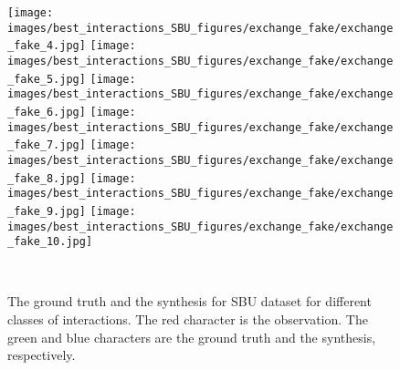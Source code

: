 \documentclass[times,twocolumn,final]{elsarticle}
\begin{document}
\begin{figure*}
\begin{minipage}{0.9\textwidth}
  \hfill
  \texttt{[image: images/best\_interactions\_SBU\_figures/exchange\_fake/exchange\_fake\_4.jpg]}
  \hfill
  \texttt{[image: images/best\_interactions\_SBU\_figures/exchange\_fake/exchange\_fake\_5.jpg]}
  \hfill
  \texttt{[image: images/best\_interactions\_SBU\_figures/exchange\_fake/exchange\_fake\_6.jpg]}
  \hfill
  \texttt{[image: images/best\_interactions\_SBU\_figures/exchange\_fake/exchange\_fake\_7.jpg]}
  \hfill
  \texttt{[image: images/best\_interactions\_SBU\_figures/exchange\_fake/exchange\_fake\_8.jpg]}
  \hfill
  \texttt{[image: images/best\_interactions\_SBU\_figures/exchange\_fake/exchange\_fake\_9.jpg]}
  \hfill
  \texttt{[image: images/best\_interactions\_SBU\_figures/exchange\_fake/exchange\_fake\_10.jpg]}
  \hfill
    \end{minipage}\\
    \caption{\label{fig:3}The ground truth and the synthesis for SBU dataset for different classes of interactions. The red character is the observation. The green and blue characters are the ground truth and the synthesis, respectively. %
    }
\end{figure*}
\end{document}
